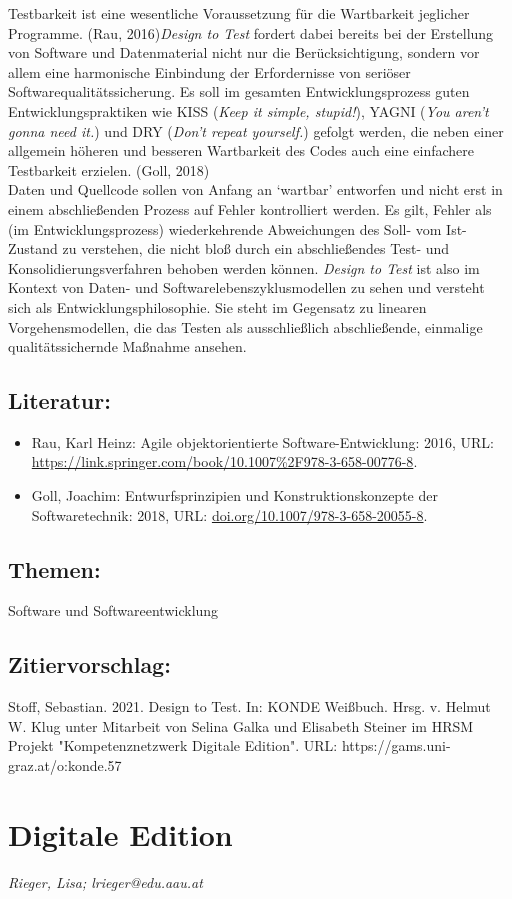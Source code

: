 \documentclass{article}
\begin{document}
    Testbarkeit ist eine wesentliche Voraussetzung für die Wartbarkeit jeglicher Programme. (Rau, 2016)\emph{Design to Test} fordert dabei bereits bei der Erstellung von Software und Datenmaterial nicht nur die Berücksichtigung, sondern vor allem eine harmonische Einbindung der Erfordernisse von seriöser Softwarequalitätssicherung. Es soll im gesamten Entwicklungsprozess guten Entwicklungspraktiken wie KISS (\emph{Keep it simple, stupid!}), YAGNI (\emph{You aren’t gonna need it.}) und DRY (\emph{Don’t repeat yourself.}) gefolgt werden, die neben einer allgemein höheren und besseren Wartbarkeit des Codes auch eine einfachere Testbarkeit erzielen. (Goll, 2018)\\
            
        Daten und Quellcode sollen von Anfang an ‘wartbar’ entworfen und nicht erst in einem abschließenden Prozess auf Fehler kontrolliert werden. Es gilt, Fehler als (im Entwicklungsprozess) wiederkehrende Abweichungen des Soll- vom Ist-Zustand zu verstehen, die nicht bloß durch ein abschließendes Test- und Konsolidierungsverfahren behoben werden können. \emph{Design to Test} ist also im Kontext von Daten- und Softwarelebenszyklusmodellen zu sehen und versteht sich als Entwicklungsphilosophie. Sie steht im Gegensatz zu linearen Vorgehensmodellen, die das Testen als ausschließlich abschließende, einmalige qualitätssichernde Maßnahme ansehen. \\
            
        \subsection*{Literatur:}\begin{itemize}\item Rau, Karl Heinz: Agile objektorientierte Software-Entwicklung: 2016, URL: \url{https://link.springer.com/book/10.1007%2F978-3-658-00776-8}.\item Goll, Joachim: Entwurfsprinzipien und Konstruktionskonzepte der Softwaretechnik: 2018, URL: \url{doi.org/10.1007/978-3-658-20055-8}.\end{itemize}\subsection*{Themen:}Software und Softwareentwicklung\subsection*{Zitiervorschlag:}Stoff, Sebastian. 2021. Design to Test. In: KONDE Weißbuch. Hrsg. v. Helmut W. Klug unter Mitarbeit von Selina Galka und Elisabeth Steiner im HRSM Projekt "Kompetenznetzwerk Digitale Edition". URL: https://gams.uni-graz.at/o:konde.57\newpage\section*{Digitale Edition} \emph{Rieger, Lisa; lrieger@edu.aau.at }\\
        
\end{document}
